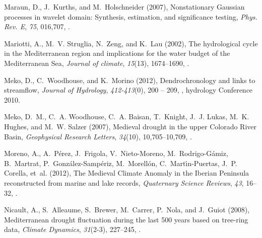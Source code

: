 \documentclass[draft,jgr]{AGUTeX}
\begin{document}
\begin{article}
\begin{thebibliography}{74}
Maraun, D., J.~Kurths, and M.~Holschneider (2007), {Nonstationary Gaussian
  processes in wavelet domain: Synthesis, estimation, and significance
  testing}, \textit{Phys. Rev. E}, \textit{75}, 016,707,
  .

Mariotti, A., M.~V. Struglia, N.~Zeng, and K.~Lau (2002), {The hydrological
  cycle in the Mediterranean region and implications for the water budget of
  the Mediterranean Sea}, \textit{Journal of climate}, \textit{15}(13),
  1674--1690,
  .

Meko, D., C.~Woodhouse, and K.~Morino (2012), Dendrochronology and links to
  streamflow, \textit{Journal of Hydrology}, \textit{412-413}(0), 200 -- 209,
  , hydrology Conference
  2010.

Meko, D.~M., C.~A. Woodhouse, C.~A. Baisan, T.~Knight, J.~J. Lukas, M.~K.
  Hughes, and M.~W. Salzer (2007), {Medieval drought in the upper Colorado
  River Basin}, \textit{Geophysical Research Letters}, \textit{34}(10),
  10,705--10,709, .

Moreno, A., A.~P{\'e}rez, J.~Frigola, V.~Nieto-Moreno, M.~Rodrigo-G{\'a}miz,
  B.~Martrat, P.~Gonz{\'a}lez-Samp{\'e}riz, M.~Morell{\'o}n,
  C.~Mart{\'\i}n-Puertas, J.~P. Corella, et~al. (2012), {The Medieval Climate
  Anomaly in the Iberian Peninsula reconstructed from marine and lake records},
  \textit{Quaternary Science Reviews}, \textit{43}, 16--32, .

Nicault, A., S.~Alleaume, S.~Brewer, M.~Carrer, P.~Nola, and J.~Guiot (2008),
  {Mediterranean drought fluctuation during the last 500 years based on
  tree-ring data}, \textit{Climate Dynamics}, \textit{31}(2-3), 227--245,
  .


\end{thebibliography}
\end{article}
\end{document}
